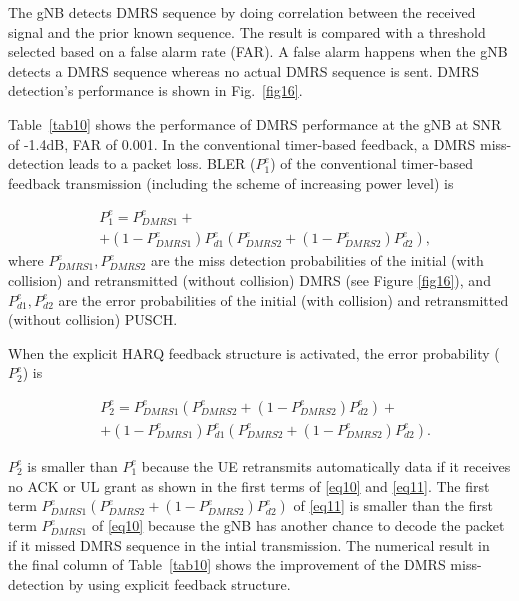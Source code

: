 \documentclass{ieeeaccess}
\begin{document}
The gNB detects DMRS sequence by doing correlation between the received signal and the prior known sequence. The result is compared with a threshold selected based on a false alarm rate (FAR). A false alarm happens when the gNB detects a DMRS sequence whereas no actual DMRS sequence is sent. DMRS detection's performance is shown in Fig.~\ref{fig16}.

Table~\ref{tab10} shows the performance of DMRS performance at the gNB at SNR of -1.4dB, FAR of 0.001. In the conventional timer-based feedback, a DMRS miss-detection leads to a packet loss. BLER ($ P^{e}_{1}$) of the conventional timer-based feedback transmission (including the scheme of increasing power level) is 

\begin{equation}
\begin{split}
 &P^{e}_{1} = P^{e}_{DMRS1} + \\
        &+ (1-P^{e}_{DMRS1})P^{e}_{d1}(P^{e}_{DMRS2} + (1-P^{e}_{DMRS2})P^{e}_{d2}),\label{eq10}   
\end{split}
\end{equation}
where $ P^{e}_{DMRS1}, P^{e}_{DMRS2}$ are the miss detection probabilities of the initial (with collision) and retransmitted (without collision) DMRS (see Figure \ref{fig16}), and $P^{e}_{d1}, P^{e}_{d2}$ are the error probabilities of the initial (with collision) and retransmitted (without collision) PUSCH.


When the explicit HARQ feedback structure is activated, the error probability ($ P^{e}_{2}$)  is 

\begin{equation}
\begin{split}
 &P^{e}_{2} = P^{e}_{DMRS1}(P^{e}_{DMRS2} + (1-P^{e}_{DMRS2})P^{e}_{d2}) + \\
        &+ (1-P^{e}_{DMRS1})P^{e}_{d1}(P^{e}_{DMRS2} + (1-P^{e}_{DMRS2})P^{e}_{d2}).\label{eq11}   
\end{split}
\end{equation}

$ P^{e}_{2}$ is smaller than $ P^{e}_{1}$ because the UE retransmits automatically data if it receives no ACK or UL grant as shown in the first terms of \eqref{eq10} and \eqref{eq11}. The first term $P^{e}_{DMRS1}(P^{e}_{DMRS2} + (1-P^{e}_{DMRS2})P^{e}_{d2})$ of \eqref{eq11} is smaller than the first term $P^{e}_{DMRS1}$ of \eqref{eq10} because the gNB has another chance to decode the packet if it missed DMRS sequence in the intial transmission. The numerical result in the final column of Table~\ref{tab10} shows the improvement of the DMRS miss-detection by using explicit feedback structure.
\end{document}
